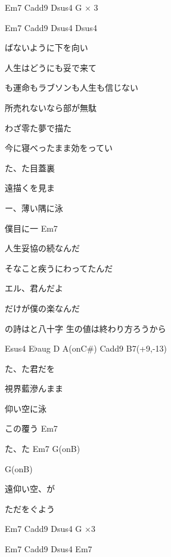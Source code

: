 \documentclass[uplatex, 11pt, dvipdfmx, twocolumn]{jsarticle}
\begin{document}
\vspace{2mm}

Em7 Cadd9  Dsus4 G $\times$ 3

Em7 Cadd9  Dsus4 Dsus4

\newpage

ばないように下を向い

人生はどうにも妥で来て

も運命もラブソンも人生も信じない

所売れないなら部が無駄

わざ零た夢で描た

今に寝べったまま効をってい

\vspace{2mm}

た、た目蓋裏

遠描くを見ま

ー、薄い隅に泳

僕目に一 Em7

\vspace{2mm}

人生妥協の続なんだ

そなこと疾うにわってたんだ

エル、君んだよ

だけが僕の楽なんだ

の詩はと八十字
生の値は終わり方ろうから

Esus4 E$\flat$aug D A(onC\#) Cadd9 B7(+9,-13)

た、た君だを

視界藍滲んまま

仰い空に泳

この覆う Em7

た、た Em7 G(onB)

 G(onB)

遠仰い空、が

ただをぐよう

Em7 Cadd9 Dsus4 G $\times 3$

Em7 Cadd9 Dsus4 Em7
\end{document}
